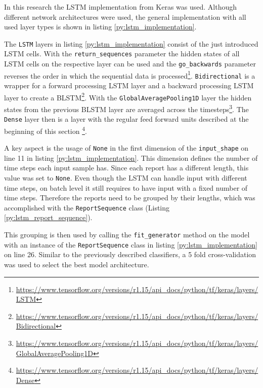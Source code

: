 In this research the \ac{LSTM} implementation from Keras was used.
Although different network architectures were used, the general implementation with all used layer types is shown in listing \ref{py:lstm_implementation}.

The \texttt{LSTM} layers in listing \ref{py:lstm_implementation} consist of the just introduced \ac{LSTM} cells.
With the \texttt{return\_sequences} parameter the hidden states of all \ac{LSTM} cells on the respective layer can be used and the \texttt{go\_backwards} parameter reverses the order in which the sequential data is processed\footnote{\url{https://www.tensorflow.org/versions/r1.15/api_docs/python/tf/keras/layers/LSTM}}.
\texttt{Bidirectional} is a wrapper for a forward processing \ac{LSTM} layer and a backward processing \ac{LSTM} layer to create a \ac{BLSTM}\footnote{\url{https://www.tensorflow.org/versions/r1.15/api_docs/python/tf/keras/layers/Bidirectional}}.
With the \texttt{GlobalAveragePooling1D} layer the hidden states from the previous \ac{BLSTM} layer are averaged across the timesteps\footnote{\url{https://www.tensorflow.org/versions/r1.15/api_docs/python/tf/keras/layers/GlobalAveragePooling1D}}.
The \texttt{Dense} layer then is a layer with the regular feed forward units described at the beginning of this section \footnote{\url{https://www.tensorflow.org/versions/r1.15/api_docs/python/tf/keras/layers/Dense}}.

A key aspect is the usage of \texttt{None} in the first dimension of the \texttt{input\_shape} on line 11 in listing \ref{py:lstm_implementation}.
This dimension defines the number of time steps each input sample has.
Since each report has a different length, this value was set to \texttt{None}.
Even though the \ac{LSTM} can handle input with different time steps, on batch level it still requires to have input with a fixed number of time steps.
Therefore the reports need to be grouped by their lengths, which was accomplished with the \texttt{ReportSequence} class (Listing \ref{py:lstm_report_sequence}).

This grouping is then used by calling the \texttt{fit\_generator} method on the model with an instance of the \texttt{ReportSequence} class in listing \ref{py:lstm_implementation} on line 26.
Similar to the previously described classifiers, a 5 fold cross-validation was used to select the best model architecture.

